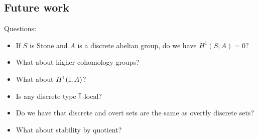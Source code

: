 \subsection{Future work}

Questions:
\begin{itemize}
\item If $S$ is Stone and $A$ is a discrete abelian group, do we have $H^1(S,A) = 0$? 
\item What about higher cohomology groups? 
\item What about $H^1(\mathbb{I},A)$? 
\item Is any discrete type $\mathbb{I}$-local? 
\item Do we have that discrete and overt sets are the same as overtly discrete sets?
\item What about stability by quotient?
\end{itemize}